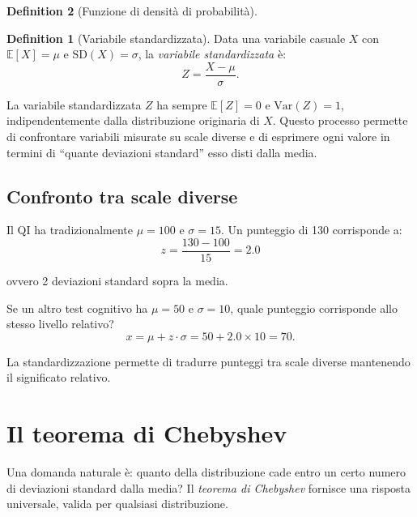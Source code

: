 \documentclass[
  letterpaper,
  DIV=11,
  numbers=noendperiod,
  oneside]{scrreprt}
\theoremstyle{definition}
\theoremstyle{plain}
\theoremstyle{definition}
\newtheorem{definition}{Definition}[chapter]
\theoremstyle{remark}
\begin{document}
\begin{definition}[Funzione di densità di
probabilità]
\begin{definition}[Variabile
standardizzata]
Data una variabile casuale \(X\) con \(\mathbb{E}[X] = \mu\) e
\(\text{SD}(X) = \sigma\), la \emph{variabile standardizzata} è: \[
Z = \frac{X - \mu}{\sigma}.
\]

\end{definition}

La variabile standardizzata \(Z\) ha sempre \(\mathbb{E}[Z] = 0\) e
\(\text{Var}(Z) = 1\), indipendentemente dalla distribuzione originaria
di \(X\). Questo processo permette di confrontare variabili misurate su
scale diverse e di esprimere ogni valore in termini di ``quante
deviazioni standard'' esso disti dalla media.

\begin{tcolorbox}[enhanced jigsaw, arc=.35mm, breakable, colbacktitle=quarto-callout-note-color!10!white, opacityback=0, toprule=.15mm, rightrule=.15mm, colback=white, opacitybacktitle=0.6, leftrule=.75mm, coltitle=black, bottomtitle=1mm, left=2mm, toptitle=1mm, title=\textcolor{quarto-callout-note-color}{\faInfo}\hspace{0.5em}{Esempio: Standardizzazione dei punteggi QI}, titlerule=0mm, bottomrule=.15mm, colframe=quarto-callout-note-color-frame]

\subsection{Confronto tra scale
diverse}\label{confronto-tra-scale-diverse}

Il QI ha tradizionalmente \(\mu = 100\) e \(\sigma = 15\). Un punteggio
di 130 corrisponde a: \[
z = \frac{130 - 100}{15} = 2.0
\]

ovvero 2 deviazioni standard sopra la media.

Se un altro test cognitivo ha \(\mu = 50\) e \(\sigma = 10\), quale
punteggio corrisponde allo stesso livello relativo? \[
x = \mu + z \cdot \sigma = 50 + 2.0 \times 10 = 70.
\]

La standardizzazione permette di tradurre punteggi tra scale diverse
mantenendo il significato relativo.

\end{tcolorbox}

\section{Il teorema di Chebyshev}\label{il-teorema-di-chebyshev}

Una domanda naturale è: quanto della distribuzione cade entro un certo
numero di deviazioni standard dalla media? Il \emph{teorema di
Chebyshev} fornisce una risposta universale, valida per qualsiasi
distribuzione.


\end{definition}
\end{document}
